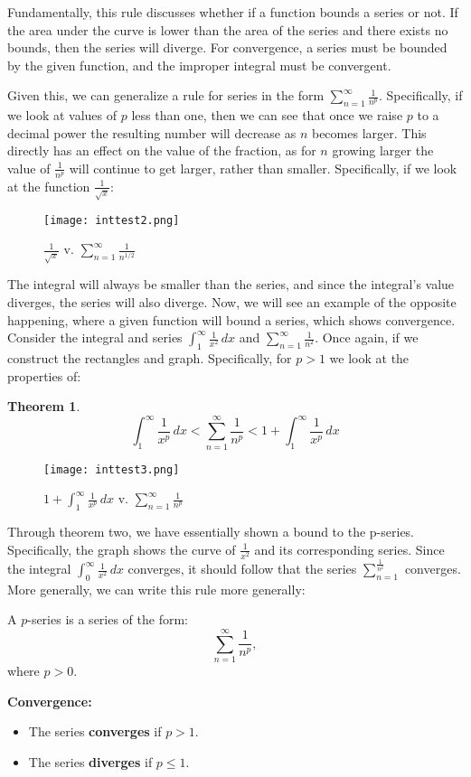 \documentclass[a4paper, 11pt]{article}
\newtheorem{theorem}{Theorem}
\newenvironment{concept}{%
    \vspace{1em}
    \begin{tcolorbox}[colframe=black!70, colback=white!95, title=Definition]
}{%
    \end{tcolorbox}
    \vspace{1em}
}
\begin{document}
Fundamentally, this rule discusses whether if a function bounds a series or not. If the area under the curve is lower than the area of the series and there exists no bounds, then the series will diverge. For convergence, a series must be bounded by the given function, and the improper integral must be convergent.
\par
Given this, we can generalize a rule for series in the form $\sum_{n=1}^\infty \frac{1}{n^p}$. Specifically, if we look at values of $p$ less than one, then we can see that once we raise $p$ to a decimal power the resulting number will decrease as $n$ becomes larger. This directly has an effect on the value of the fraction, as for $n$ growing larger the value of $\frac{1}{n^p}$ will continue to get larger, rather than smaller. Specifically, if we look at the function $\frac{1}{\sqrt{x}}$:
\begin{figure}[h]
    \caption{ $\frac{1}{\sqrt{x}}$ v.  $\sum_{n=1}^\infty \frac{1}{n^{1/2}}$}
    \centering
    \texttt{[image: inttest2.png]}
\end{figure}
The integral will always be smaller than the series, and since the integral's value diverges, the series will also diverge. 
Now, we will see an example of the opposite happening, where a given function will bound a series, which shows convergence. Consider the integral and series $\int_{1}^{\infty} \frac{1}{x^2} \, dx$ and $\sum_{n=1}^{\infty} \frac{1}{n^2}$. Once again, if we construct the rectangles and graph. Specifically, for $p>1$ we look at the properties of:
\begin{theorem}
    \[
    \int_1^{\infty} \frac{1}{x^p} \, dx < \sum_{n=1}^\infty \frac{1}{n^p} <  1 + \int_1^{\infty} \frac{1}{x^p} \, dx
    \]
\end{theorem}
\begin{figure}[htbp]
    \caption{$1 + \int_1^{\infty} \frac{1}{x^p} \, dx$ v. $\sum_{n=1}^\infty \frac{1}{n^p}$}
    \centering
    \texttt{[image: inttest3.png]}
\end{figure}
Through theorem two, we have essentially shown a bound to the p-series. Specifically, the graph shows the curve of $\frac{1}{x^2}$ and its corresponding series. Since the integral $\int_{0}^{\infty} \frac{1}{x^2} \, dx$ converges, it should follow that the series $\sum_{n=1}^{\frac{1}{n^2}}$ converges. More generally, we can write this rule more generally: 
\begin{concept}
A \(p\)-series is a series of the form:
\[
\sum_{n=1}^\infty \frac{1}{n^p},
\]
where \(p > 0\).

\textbf{Convergence:}
\begin{itemize}
    \item The series \textbf{converges} if \(p > 1\).
    \item The series \textbf{diverges} if \(p \leq 1\).
\end{itemize}
\end{concept}
\end{document}
